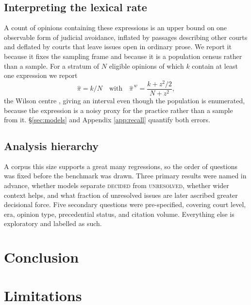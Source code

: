 \documentclass[11pt]{article}
\begin{document}
\subsection{Interpreting the lexical rate} A count of opinions containing these
expressions is an upper bound on one observable form of judicial avoidance,
inflated by passages describing other courts and deflated by courts that leave
issues open in ordinary prose. We report it because it fixes the sampling frame
and because it is a population census rather than a sample. For a stratum of $N$
eligible opinions of which $k$ contain at least one expression we report
\begin{equation}
\hat{\pi}=k/N \quad\text{with}\quad
\hat{\pi}^{\,w}=\frac{k+z^{2}/2}{N+z^{2}},
\end{equation}
the Wilson centre \citep{wilson1927probable}, giving an interval even though the
population is enumerated, because the expression is a noisy proxy for the
practice rather than a sample from it. \S\ref{sec:models} and Appendix
\ref{app:recall} quantify both errors.

\subsection{Analysis hierarchy} A corpus this size supports a great many
regressions, so the order of questions was fixed before the benchmark was drawn.
Three primary results were named in advance, whether models separate
\textsc{decided} from \textsc{unresolved}, whether wider context helps, and what
fraction of unresolved issues are later ascribed greater decisional force. Five
secondary questions were pre-specified, covering court level, era, opinion type,
precedential status, and citation volume. Everything else is exploratory and
labelled as such.



\section{Conclusion}
\label{sec:conclusion}


\clearpage

\section*{Limitations}
\end{document}
